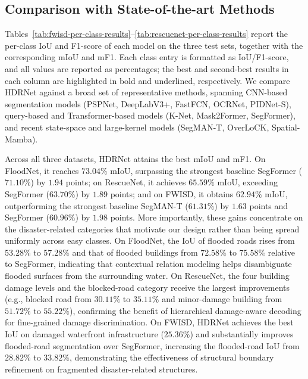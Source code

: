 \documentclass[lettersize,journal]{IEEEtran}
\begin{document}
\subsection{Comparison with State-of-the-art Methods}
Tables~\ref{tab:fwisd-per-class-results}--\ref{tab:rescuenet-per-class-results} report the per-class IoU and F1-score of each model on the three test sets, together with the corresponding mIoU and mF1. Each class entry is formatted as IoU/F1-score, and all values are reported as percentages; the best and second-best results in each column are highlighted in bold and underlined, respectively. We compare HDRNet against a broad set of representative methods, spanning CNN-based segmentation models (PSPNet\cite{zhaoPyramidSceneParsing2017a}, DeepLabV3+\cite{chenRethinkingAtrousConvolution2017}, FastFCN\cite{wu2019fastfcn}, OCRNet\cite{YuanCW20}, PIDNet-S\cite{xu2022pidnet}), query-based and Transformer-based models (K-Net\cite{zhang2021knet}, Mask2Former\cite{NEURIPS2021_950a4152}, SegFormer\cite{xie2021segformer}), and recent state-space and large-kernel models (SegMAN-T\cite{SegMAN}, OverLoCK\cite{lou2025overlock}, Spatial-Mamba\cite{xiao2025spatialmamba}).

Across all three datasets, HDRNet attains the best mIoU and mF1. On FloodNet, it reaches $73.04\%$ mIoU, surpassing the strongest baseline SegFormer ($71.10\%$) by $1.94$ points; on RescueNet, it achieves $65.59\%$ mIoU, exceeding SegFormer ($63.70\%$) by $1.89$ points; and on FWISD, it obtains $62.94\%$ mIoU, outperforming the strongest baseline SegMAN-T ($61.31\%$) by $1.63$ points and SegFormer ($60.96\%$) by $1.98$ points. More importantly, these gains concentrate on the disaster-related categories that motivate our design rather than being spread uniformly across easy classes. On FloodNet, the IoU of flooded roads rises from $53.28\%$ to $57.28\%$ and that of flooded buildings from $72.58\%$ to $75.58\%$ relative to SegFormer, indicating that contextual relation modeling helps disambiguate flooded surfaces from the surrounding water. On RescueNet, the four building damage levels and the blocked-road category receive the largest improvements (e.g., blocked road from $30.11\%$ to $35.11\%$ and minor-damage building from $51.72\%$ to $55.22\%$), confirming the benefit of hierarchical damage-aware decoding for fine-grained damage discrimination. On FWISD, HDRNet achieves the best IoU on damaged waterfront infrastructure ($25.36\%$) and substantially improves flooded-road segmentation over SegFormer, increasing the flooded-road IoU from $28.82\%$ to $33.82\%$, demonstrating the effectiveness of structural boundary refinement on fragmented disaster-related structures.
\end{document}
